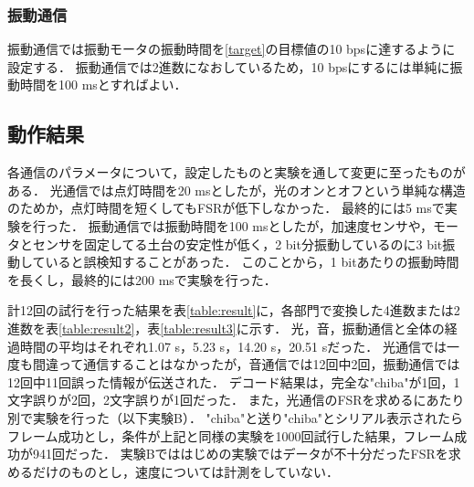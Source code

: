 \subsubsection{振動通信}
振動通信では振動モータの振動時間を\ref{target}の目標値の10 bpsに達するように設定する．
振動通信では2進数になおしているため，10 bpsにするには単純に振動時間を100 msとすればよい．



\subsection{動作結果}
\label{result}
各通信のパラメータについて，設定したものと実験を通して変更に至ったものがある．
光通信では点灯時間を20 msとしたが，光のオンとオフという単純な構造のためか，点灯時間を短くしてもFSRが低下しなかった．
最終的には5 msで実験を行った．
振動通信では振動時間を100 msとしたが，加速度センサや，モータとセンサを固定してる土台の安定性が低く，2 bit分振動しているのに3 bit振動していると誤検知することがあった．
このことから，1 bitあたりの振動時間を長くし，最終的には200 msで実験を行った．
\par 
計12回の試行を行った結果を表\ref{table:result}に，各部門で変換した4進数または2進数を表\ref{table:result2}，表\ref{table:result3}に示す．
光，音，振動通信と全体の経過時間の平均はそれぞれ1.07 s，5.23 s，14.20 s，20.51 sだった．
光通信では一度も間違って通信することはなかったが，音通信では12回中2回，振動通信では12回中11回誤った情報が伝送された．
デコード結果は，完全な"chiba"が1回，1文字誤りが2回，2文字誤りが1回だった．
また，光通信のFSRを求めるにあたり別で実験を行った（以下実験B）．
"chiba"と送り"chiba"とシリアル表示されたらフレーム成功とし，条件が上記と同様の実験を1000回試行した結果，フレーム成功が941回だった．
実験Bでははじめの実験ではデータが不十分だったFSRを求めるだけのものとし，速度については計測をしていない．


